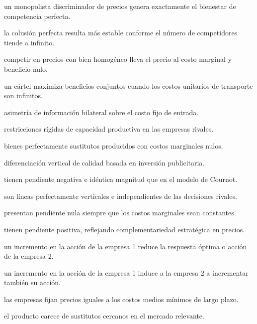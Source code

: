 \begin{opts}
    \item un monopolista discriminador de precios genera exactamente el bienestar de competencia perfecta.
    \item la colusión perfecta resulta más estable conforme el número de competidores tiende a infinito.
    \item competir en precios con bien homogéneo lleva el precio al costo marginal y beneficio nulo.
    \item un cártel maximiza beneficios conjuntos cuando los costos unitarios de transporte son infinitos.
\end{opts}

\begin{opts}
    \item asimetría de información bilateral sobre el costo fijo de entrada.
    \item restricciones rígidas de capacidad productiva en las empresas rivales.
    \item bienes perfectamente sustitutos producidos con costos marginales nulos.
    \item diferenciación vertical de calidad basada en inversión publicitaria.
\end{opts}

\begin{opts}
    \item tienen pendiente negativa e idéntica magnitud que en el modelo de Cournot.
    \item son líneas perfectamente verticales e independientes de las decisiones rivales.
    \item presentan pendiente nula siempre que los costos marginales sean constantes.
    \item tienen pendiente positiva, reflejando complementariedad estratégica en precios.
\end{opts}

\begin{opts}
    \item un incremento en la acción de la empresa 1 reduce la respuesta óptima o acción de la empresa 2.
    \item un incremento en la acción de la empresa 1 induce a la empresa 2 a incrementar también su acción.
    \item las empresas fijan precios iguales a los costos medios mínimos de largo plazo.
    \item el producto carece de sustitutos cercanos en el mercado relevante.
\end{opts}

